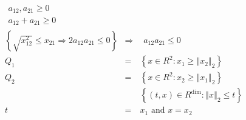 \documentclass{article}
\begin{document}
\begin{eqnarray*}
\begin{array}{c}
a_{12},a_{21}\geq 0 \\ 
a_{12}+a_{21}\geq 0%
\end{array}
\\
\left\{ \sqrt{x_{12}^{2}}\leq x_{21}\Longrightarrow 2a_{12}a_{21}\leq
0\right\}  &\Longrightarrow &%
\begin{array}{c}
a_{12}a_{21}\leq 0%
\end{array}
\\
Q_{1} &=&\left\{ x\in R^{2}:x_{1}\geq \left\Vert x_{2}\right\Vert
_{2}\right\}  \\
Q_{2} &=&\left\{ x\in R^{2}:x_{2}\geq \left\Vert x_{1}\right\Vert
_{2}\right\}  \\
&&\left\{ \left( t,x\right) \in R^{\dim }:\left\Vert x\right\Vert _{2}\leq
t\right\}  \\
t &=&x_{1}\text{ and }x=x_{2}
\end{eqnarray*}
\end{document}
